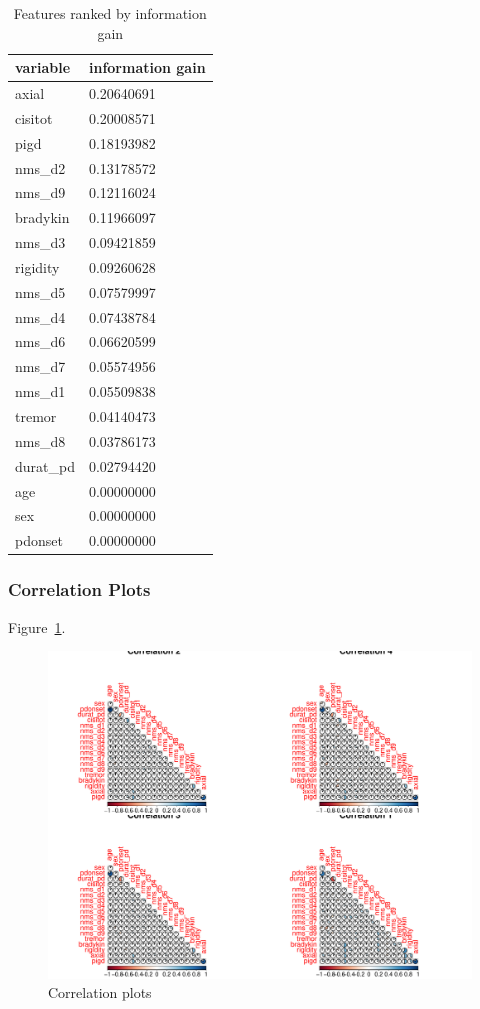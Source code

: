 \documentclass[letterpaper,12pt]{article}
\begin{document}
\begin{table}[h]
  \centering
  \caption{Features ranked by information gain}
  \label{tab:info_gain}
  \begin{tabular}{l|l}
    variable & information gain \\
    \hline
    axial      & 0.20640691 \\
    cisitot      & 0.20008571 \\
    pigd      & 0.18193982 \\
    nms\_d2      & 0.13178572 \\
    nms\_d9      & 0.12116024 \\
    bradykin      & 0.11966097 \\
    nms\_d3      & 0.09421859 \\
    rigidity      & 0.09260628 \\
    nms\_d5      & 0.07579997 \\
    nms\_d4      & 0.07438784 \\
    nms\_d6      & 0.06620599 \\
    nms\_d7      & 0.05574956 \\
    nms\_d1      & 0.05509838 \\
    tremor      & 0.04140473 \\
    nms\_d8      & 0.03786173 \\
    durat\_pd      & 0.02794420 \\
    age      & 0.00000000 \\
    sex      & 0.00000000 \\
    pdonset      & 0.00000000 \\
  \end{tabular}
\end{table}

\subsubsection{Correlation Plots}

Figure~\ref{fig:corrplots}.

\begin{figure}[h]
  \centering
  \includegraphics[width=\linewidth]{corrplots.pdf}
  \caption{Correlation plots}
  \label{fig:corrplots}
\end{figure}
\end{document}
